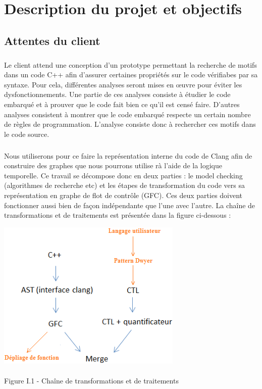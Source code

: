 \documentclass{report}
\begin{document}
\chapter{Description du projet et objectifs}

\section{Attentes du client}

\paragraph{}
\hspace{4mm}\textnormal{Le client attend une conception d'un prototype permettant la recherche de motifs dans un code
 C++ afin d'assurer certaines propri\'{e}t\'{e}s sur le code v\'{e}rifiabes par sa syntaxe.
 Pour cela, diff\'{e}rentes analyses seront mises en \oe{}uvre pour \'{e}viter les dysfonctionnements.
 Une partie de ces analyses consiste \`{a} \'{e}tudier le code embarqu\'{e} et \`{a} prouver que le code fait bien
 ce qu'il est cens\'{e} faire. D'autres analyses consistent \`{a} montrer que le code embarqu\'{e} respecte un
 certain nombre de r\`{e}gles de programmation. L'analyse consiste donc \`{a} rechercher ces motifs dans
 le code source.}

\paragraph{}
\hspace{4mm}\textnormal{Nous utiliserons pour ce faire la repr\'{e}sentation interne du code de Clang afin de construire des graphes que nous pourrons utilise r\`{a} l'aide de la logique temporelle.
Ce travail se d\'{e}compose donc en deux parties : le model checking (algorithmes de recherche etc) et les \'{e}tapes de transformation du code vers sa repr\'{e}sentation en graphe de flot de contr\^{o}le (GFC). 
Ces deux parties doivent fonctionner aussi bien de fa\c{c}on ind\'{e}pendante que l'une avec l'autre. La cha\^{i}ne de transformations et de traitements est pr\'{e}sent\'{e}e
dans la figure ci-dessous :}

\begin{center}
\includegraphics[scale=0.7]{data/tasks.png}
~\\~\\Figure I.1 - Cha\^{i}ne de transformations et de traitements
\end{center}
\end{document}
